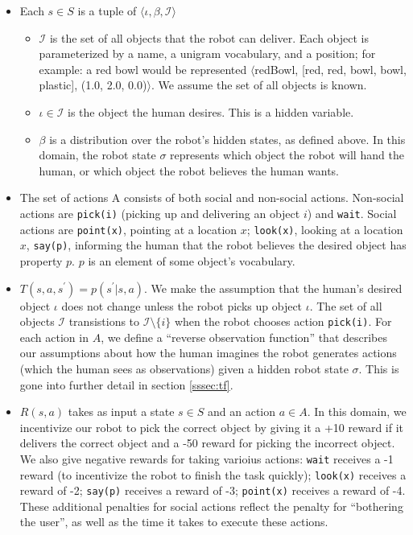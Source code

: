 \documentclass{article}
\newcommand{\Iota}{\mathcal{I}}
\begin{document}
\begin{itemize}
	\item Each $s \in S$ is a tuple of $\langle \iota, \beta, \Iota \rangle$		\begin{itemize}
			\item $\Iota$ is the set of all objects that the robot can deliver. Each object is parameterized by a name, a unigram vocabulary, and a position; for example: a red bowl would be represented $\langle$redBowl, [red, red, bowl, bowl, plastic], (1.0, 2.0, 0.0)$\rangle$. We assume the set of all objects is known. 
			\item $\iota \in \Iota$ is the object the human desires. This is a hidden variable. 
			\item $\beta$ is a distribution over the robot's hidden states, as defined above. In this domain, the robot state $\sigma$ represents which object the robot will hand the human, or which object the robot believes the human wants. 
		\end{itemize}
	\item The set of actions A consists of both social and non-social actions. Non-social actions are \texttt{pick(i)} (picking up  and delivering an object $i$) and \texttt{wait}. Social actions are \texttt{point(x)}, pointing at a location $x$; \texttt{look(x)}, looking at a location $x$, \texttt{say(p)}, informing the human that the robot believes the desired object has property $p$. $p$ is an element of some object's vocabulary. 
	\item $T(s, a, s^\prime) = p(s^\prime | s, a)$. We make the assumption that the human's desired object $\iota$ does not change unless the robot picks up object $\iota$. The set of all objects $\Iota$ transistions to $\Iota \setminus \{i\}$ when the robot chooses action \texttt{pick(i)}. For each action in $A$, we define a ``reverse observation function'' that describes our assumptions about how the human imagines the robot generates actions (which the human sees as observations) given a hidden robot state $\sigma$. This is gone into further detail in section  \ref{sssec:tf}. 
	\item $R(s, a)$ takes as input a state $s \in S$ and an action $a \in A$. In this domain, we incentivize our robot to pick the correct object by giving it a +10 reward if it delivers the correct object and a -50 reward for picking the incorrect object. We also give negative rewards for taking varioius actions: \texttt{wait} receives a -1 reward (to incentivize the robot to finish the task quickly); \texttt{look(x)} receives a reward of -2; \texttt{say(p)} receives a reward of -3; \texttt{point(x)}  receives a reward of -4. These additional penalties for social actions reflect the penalty for ``bothering the user'', as well as the time it takes to execute these actions. 

\end{itemize}
\end{document}
